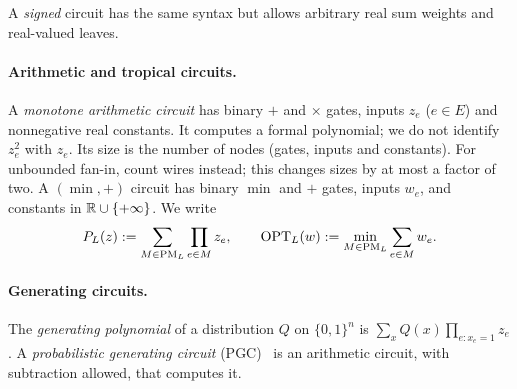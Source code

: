 A \emph{signed} circuit has the same syntax but allows arbitrary real sum weights and real-valued leaves.

\paragraph{Arithmetic and tropical circuits.} A \emph{monotone arithmetic circuit} has binary $+$ and $\times$ gates, inputs $z_e$ ($e\in E$) and nonnegative real constants. It computes a formal polynomial; we do not identify $z_e^2$ with $z_e$. Its size is the number of nodes (gates, inputs and constants). For unbounded fan-in, count wires instead; this changes sizes by at most a factor of two. A $(\min,+)$ circuit has binary $\min$ and $+$ gates, inputs $w_e$, and constants in $\mathbb{R}\cup\{+\infty\}$. We write
\[
  P_L(z):=\sum_{M\in\mathrm{PM}_L}\prod_{e\in M}z_e,\qquad \mathrm{OPT}_L(w):=\min_{M\in\mathrm{PM}_L}\sum_{e\in M}w_e .
\]
\paragraph{Generating circuits.} The \emph{generating polynomial} of a distribution $Q$ on $\{0,1\}^n$ is $\sum_xQ(x)\prod_{e:x_e=1}z_e$. A \emph{probabilistic generating circuit} (PGC)~\cite{ZhangJubaVdB21} is an arithmetic circuit, with subtraction allowed, that computes it.
